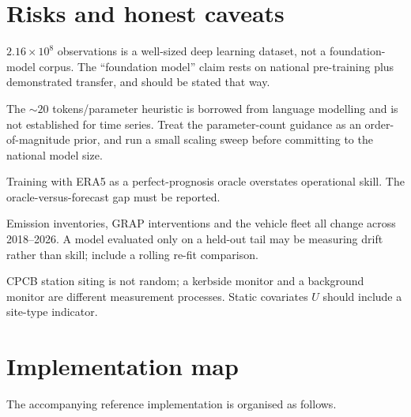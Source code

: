 \documentclass[11pt,a4paper]{article}
\begin{document}
\section{Risks and honest caveats}

\begin{description}[leftmargin=1.4em,style=nextline]
\item[Scale.] $2.16\times10^{8}$ observations is a well-sized deep learning
dataset, not a foundation-model corpus. The ``foundation model'' claim rests on
national pre-training plus demonstrated transfer, and should be stated that way.
\item[Scaling-law transfer.] The $\sim\!20$ tokens/parameter heuristic is
borrowed from language modelling and is not established for time series. Treat
the parameter-count guidance as an order-of-magnitude prior, and run a small
scaling sweep before committing to the national model size.
\item[NWP dependence.] Training with ERA5 as a perfect-prognosis oracle
overstates operational skill. The oracle-versus-forecast gap must be reported.
\item[Non-stationarity.] Emission inventories, GRAP interventions and the vehicle
fleet all change across 2018--2026. A model evaluated only on a held-out tail
may be measuring drift rather than skill; include a rolling re-fit comparison.
\item[Station representativeness.] CPCB station siting is not random; a
kerbside monitor and a background monitor are different measurement processes.
Static covariates $U$ should include a site-type indicator.
\end{description}

\section{Implementation map}

The accompanying reference implementation is organised as follows.
\end{document}
